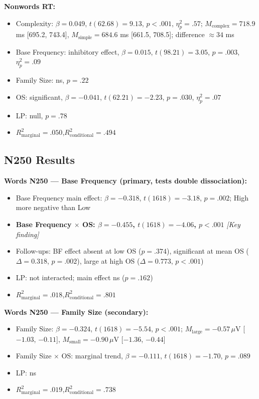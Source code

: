 \documentclass[11pt, a4paper]{article}
\begin{document}
\textbf{Nonwords RT:}
\begin{itemize}[leftmargin=1.5em]
  \item Complexity: $\beta = 0.049$, $t(62.68) = 9.13$, $p < .001$, $\eta^2_p = .57$;
        $M_\text{complex} = 718.9$ ms [695.2, 743.4], $M_\text{simple} = 684.6$ ms [661.5, 708.5]; difference $\approx 34$ ms
  \item Base Frequency: inhibitory effect, $\beta = 0.015$, $t(98.21) = 3.05$, $p = .003$, $\eta^2_p = .09$
  \item Family Size: ns, $p = .22$
  \item OS: significant, $\beta = -0.041$, $t(62.21) = -2.23$, $p = .030$, $\eta^2_p = .07$
  \item LP: null, $p = .78$
  \item $R^2_\text{marginal} = .050$,\quad $R^2_\text{conditional} = .494$
\end{itemize}

\subsection{N250 Results}

\textbf{Words N250 — Base Frequency (primary, tests double dissociation):}
\begin{itemize}[leftmargin=1.5em]
  \item Base Frequency main effect: $\beta = -0.318$, $t(1618) = -3.18$, $p = .002$; High more negative than Low
  \item \textbf{Base Frequency $\times$ OS: $\beta = -0.455$, $t(1618) = -4.06$, $p < .001$} \textit{[Key finding]}
  \item Follow-ups: BF effect absent at low OS ($p = .374$), significant at mean OS ($\Delta = 0.318$, $p = .002$), large at high OS ($\Delta = 0.773$, $p < .001$)
  \item LP: not interacted; main effect ns ($p = .162$)
  \item $R^2_\text{marginal} = .018$,\quad $R^2_\text{conditional} = .801$
\end{itemize}

\textbf{Words N250 — Family Size (secondary):}
\begin{itemize}[leftmargin=1.5em]
  \item Family Size: $\beta = -0.324$, $t(1618) = -5.54$, $p < .001$;
        $M_\text{large} = -0.57\,\mu$V [$-1.03$, $-0.11$], $M_\text{small} = -0.90\,\mu$V [$-1.36$, $-0.44$]
  \item Family Size $\times$ OS: marginal trend, $\beta = -0.111$, $t(1618) = -1.70$, $p = .089$
  \item LP: ns
  \item $R^2_\text{marginal} = .019$,\quad $R^2_\text{conditional} = .738$
\end{itemize}
\end{document}
